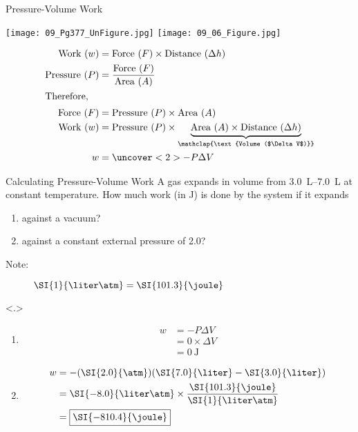 \documentclass[11pt,letterpaper]{article}
\begin{document}

\begin{frame}{Pressure-Volume Work}
	\begin{center}
		\texttt{[image: 09\_Pg377\_UnFigure.jpg]}\qquad
		\texttt{[image: 09\_06\_Figure.jpg]}
	\end{center}
	\begin{align*}
		\text{Work ($w$)} &= \text{Force ($F$)} \times \text{Distance
		($\Delta h$)}
		\\
		\text{Pressure ($P$)} &= \frac{\text{Force ($F$)}}{\text{Area
		($A$)}} \\
		\shortintertext{Therefore,}
		\text{Force ($F$)} &= \text{Pressure ($P$)} \times \text{Area
		($A$)} \\
		\text{Work ($w$)} &= \text{Pressure ($P$)} \times \underbrace{\text{Area
		($A$)} \times \text{Distance ($\Delta h$)}}_{\mathclap{\text{Volume ($\Delta
		V$)}}} \\
		w &= \uncover<2>{-}P \Delta V
	\end{align*}
\end{frame}

\begin{frame}[t]{Calculating Pressure-Volume Work}
	A gas expands in volume from \SIrange{3.0}{7.0}{\liter} at constant
	temperature. How much work (in \si{\joule}) is done by the system if it
	expands 
	\begin{enumerate}[<only@+>] 
		\item against a vacuum?
			\mode<article>{\vfill}
		\item against a constant external pressure of \SI{2.0}{\atm}?
			\mode<article>{\vfill}
	\end{enumerate}

	\begin{description}
		\item[Note:] $\SI{1}{\liter\atm} = \SI{101.3}{\joule}$
	\end{description}

	{
		\begin{enumerate}
			\item \begin{align*}
					w &= -P \Delta V \\
					&= 0 \times \Delta V \\
					&= \boxed{\SI{0}{\joule}}
			\end{align*}
			\item \begin{align*}
					w &= -(\SI{2.0}{\atm})(\SI{7.0}{\liter}
					- \SI{3.0}{\liter}) \\
					&= \SI{-8.0}{\liter\atm} \times
					\frac{\SI{101.3}{\joule}}{\SI{1}{\liter\atm}}
					\\
					&= \boxed{\SI{-810.4}{\joule}}
			\end{align*}
		\end{enumerate}
		}
\end{frame}
\end{document}

